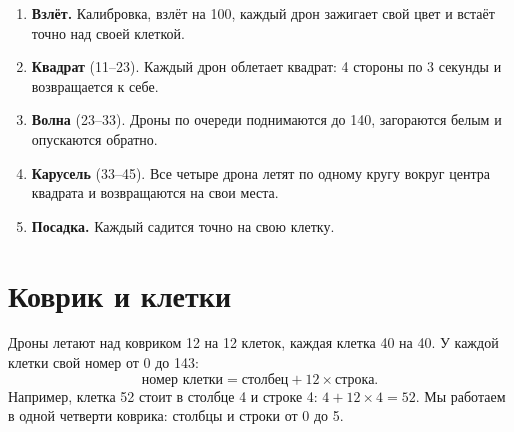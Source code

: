 \documentclass[a4paper,11pt]{scrartcl}
\begin{document}
\begin{enumerate}
  \item \textbf{Взлёт.} Калибровка, взлёт на 100\cm, каждый дрон зажигает свой цвет и встаёт точно над своей клеткой.
  \item \textbf{Квадрат} (11--23\sek). Каждый дрон облетает квадрат: 4 стороны по 3 секунды и возвращается к себе.
  \item \textbf{Волна} (23--33\sek). Дроны по очереди поднимаются до 140\cm, загораются белым и опускаются обратно.
  \item \textbf{Карусель} (33--45\sek). Все четыре дрона летят по одному кругу вокруг центра квадрата и возвращаются на свои места.
  \item \textbf{Посадка.} Каждый садится точно на свою клетку.
\end{enumerate}

\section{Коврик и клетки}

Дроны летают над ковриком 12 на 12 клеток, каждая клетка 40 на 40\cm. У каждой клетки свой номер от 0 до 143:
\[
  \text{номер клетки} = \text{столбец} + 12 \times \text{строка}.
\]
Например, клетка 52 стоит в столбце 4 и строке 4: $4 + 12 \times 4 = 52$. Мы работаем в одной четверти коврика: столбцы и строки от 0 до 5.
\end{document}
